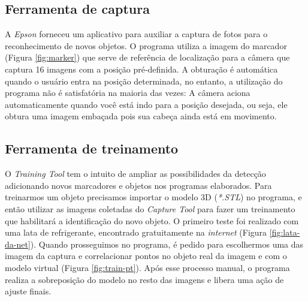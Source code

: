 \subsection{Ferramenta de captura}

A \textit{Epson} forneceu um aplicativo para auxiliar a captura de fotos para o reconhecimento de novos objetos. O programa utiliza a imagem do marcador (Figura \ref{fig:marker}) que serve de referência de localização para a câmera que captura 16 imagens com a posição pré-definida. A obturação é automática quando o usuário entra na posição determinada, no entanto, a utilização do programa não é satisfatória na maioria das vezes: A câmera aciona automaticamente quando você está indo para a posição desejada, ou seja, ele obtura uma imagem embaçada pois sua cabeça ainda está em movimento.

\subsection{Ferramenta de treinamento}

O \textit{Training Tool} tem o intuito de ampliar as possibilidades da detecção adicionando novos marcadores e objetos nos programas elaborados. Para treinarmos um  objeto precisamos importar o modelo 3D (\textit{*.STL}) no programa, e então utilizar as imagens coletadas do \textit{Capture Tool} para fazer um treinamento que habilitará a identificação do novo objeto. O primeiro teste foi realizado com uma lata de refrigerante, encontrado gratuitamente na \textit{internet} (Figura \ref{fig:lata-da-net}). Quando prosseguimos no programa, é pedido para escolhermos uma das imagem da captura e correlacionar pontos no objeto real da imagem e com o modelo virtual (Figura \ref{fig:train-pt}). Após esse processo manual, o programa realiza a sobreposição do modelo no resto das imagens e libera uma ação de ajuste finais.

